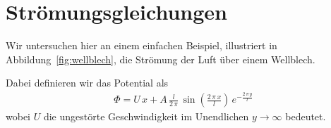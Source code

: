 %
%
%
\section{Strömungsgleichungen\label{ueberschall:stroemungsgleichung}}
Wir untersuchen hier an einem einfachen Beispiel, 
illustriert in Abbildung~\ref{fig:wellblech},
die Strömung der Luft über einem Wellblech.

Dabei definieren wir das Potential als
\begin{align*}
    \Phi
    =
    U\,x + A\,\frac{l}{2\,\pi}\,\sin\left(\frac{2\,\pi\,x}{l}\right)
    \,e^{-\frac{2\,\pi\,y}{l}}
\end{align*}
wobei $U$ die ungestörte Geschwindigkeit im 
Unendlichen $y\rightarrow\infty$ bedeutet.

